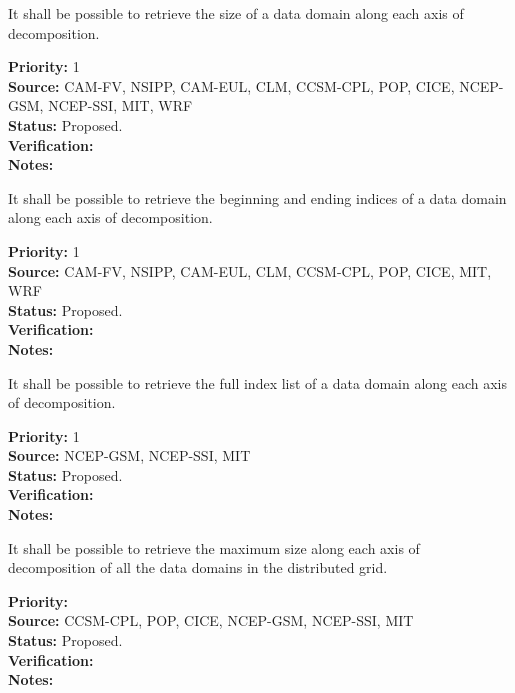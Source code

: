 

It shall be possible to retrieve the size of a data domain
along each axis of decomposition.

\begin{reqlist}
{\bf Priority:} 1 \\ 
{\bf Source:} CAM-FV, NSIPP, CAM-EUL, CLM, CCSM-CPL, POP, CICE, NCEP-GSM, NCEP-SSI, MIT, WRF \\
{\bf Status:} Proposed. \\
{\bf Verification:} \\
{\bf Notes:}
\end{reqlist}


It shall be possible to retrieve the beginning and ending indices of a
data domain along each axis of decomposition.

\begin{reqlist}
{\bf Priority:} 1 \\
{\bf Source:} CAM-FV, NSIPP, CAM-EUL, CLM, CCSM-CPL, POP, CICE, MIT, WRF \\
{\bf Status:} Proposed. \\
{\bf Verification:} \\
{\bf Notes:}
\end{reqlist}


It shall be possible to retrieve the full index list of a
data domain along each axis of decomposition.

\begin{reqlist}
{\bf Priority:} 1 \\ 
{\bf Source:} NCEP-GSM, NCEP-SSI, MIT \\
{\bf Status:} Proposed. \\
{\bf Verification:} \\
{\bf Notes:}
\end{reqlist}


It shall be possible to retrieve the maximum size along each axis of
decomposition of all the data domains in the distributed grid. 

\begin{reqlist}
{\bf Priority:} \\
{\bf Source:} CCSM-CPL, POP, CICE, NCEP-GSM, NCEP-SSI, MIT \\
{\bf Status:} Proposed. \\
{\bf Verification:} \\
{\bf Notes:}
\end{reqlist}

